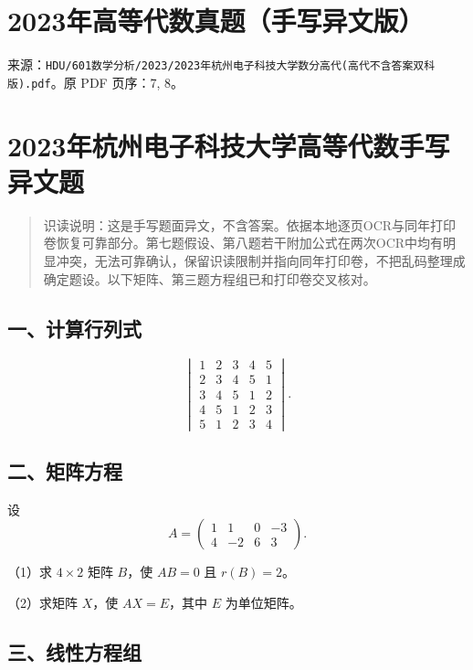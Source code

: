 \documentclass[11pt,fontset=fandol]{ctexart}
\begin{document}
\section{2023年高等代数真题（手写异文版）}\label{ux5e74ux9ad8ux7b49ux4ee3ux6570ux771fux9898ux624bux5199ux5f02ux6587ux7248}

来源：\texttt{HDU/601数学分析/2023/2023年杭州电子科技大学数分高代(高代不含答案双科版).pdf}。原
PDF 页序：7, 8。

\section{2023年杭州电子科技大学高等代数手写异文题}\label{ux5e74ux676dux5ddeux7535ux5b50ux79d1ux6280ux5927ux5b66ux9ad8ux7b49ux4ee3ux6570ux624bux5199ux5f02ux6587ux9898}

\begin{quote}
识读说明：这是手写题面异文，不含答案。依据本地逐页OCR与同年打印卷恢复可靠部分。第七题假设、第八题若干附加公式在两次OCR中均有明显冲突，无法可靠确认，保留识读限制并指向同年打印卷，不把乱码整理成确定题设。以下矩阵、第三题方程组已和打印卷交叉核对。
\end{quote}

\subsection{一、计算行列式}\label{ux4e00ux8ba1ux7b97ux884cux5217ux5f0f}

\[
\begin{vmatrix}
1&2&3&4&5\\2&3&4&5&1\\3&4&5&1&2\\4&5&1&2&3\\5&1&2&3&4
\end{vmatrix}.
\]

\subsection{二、矩阵方程}\label{ux4e8cux77e9ux9635ux65b9ux7a0b}

设 \[
A=\begin{pmatrix}1&1&0&-3\\4&-2&6&3\end{pmatrix}.
\]

（1）求 \(4\times2\) 矩阵 \(B\)，使 \(AB=0\) 且 \(r(B)=2\)。

（2）求矩阵 \(X\)，使 \(AX=E\)，其中 \(E\) 为单位矩阵。

\subsection{三、线性方程组}\label{ux4e09ux7ebfux6027ux65b9ux7a0bux7ec4}
\end{document}
